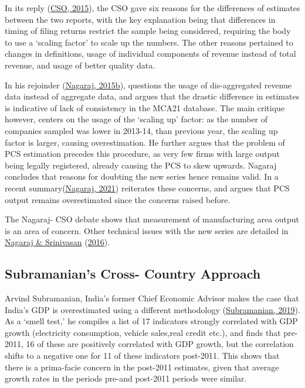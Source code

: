 \documentclass[12pt,nobind, a4paper]{reedthesis}
\begin{document}
 In its reply (\protect\hyperlink{ref-cso_no_2015}{CSO, 2015}), the CSO gave six reasons for the differences of estimates between the two reports, with the key explanation being that differences in timing of filing returns restrict the sample being considered, requiring the body to use a `scaling factor' to scale up the numbers. The other reasons pertained to changes in definitions, usage of individual components of revenue instead of total revenue, and usage of better quality data.
 \linebreak

 In his rejoinder (\protect\hyperlink{ref-nagaraj_seeds_2015}{Nagaraj, 2015b}), questions the usage of dis-aggregated revenue data instead of aggregate data, and argues that the drastic difference in estimates is indicative of lack of consistency in the MCA21 database. The main critique however, centers on the usage of the `scaling up' factor: as the number of companies sampled was lower in 2013-14, than previous year, the scaling up factor is larger, causing overestimation. He further argues that the problem of PCS estimation precedes this procedure, as very few firms with large output being legally registered, already causing the PCS to skew upwards. Nagaraj concludes that reasons for doubting the new series hence remains valid. In a recent summary(\protect\hyperlink{ref-nagaraj_revisiting_2021}{Nagaraj, 2021}) reiterates these concerns, and argues that PCS output remains overestimated since the concerns raised before.
 \linebreak

 The Nagaraj- CSO debate shows that measurement of manufacturing area output is an area of concern. Other technical issues with the new series are detailed in \protect\hyperlink{ref-nagaraj_measuring_2016}{Nagaraj \& Srinivasan} (\protect\hyperlink{ref-nagaraj_measuring_2016}{2016}).

 \hypertarget{subramanians-cross--country-approach}{%
 \subsection{Subramanian's Cross- Country Approach}\label{subramanians-cross--country-approach}}

 Arvind Subramanian, India's former Chief Economic Advisor makes the case that India's GDP is overestimated using a different methodology (\protect\hyperlink{ref-subramanian_indias_2019}{Subramanian, 2019}). As a `smell test,' he compiles a list of 17 indicators strongly correlated with GDP growth (electricity consumption, vehicle sales,real credit etc.), and finds that pre-2011, 16 of these are positively correlated with GDP growth, but the correlation shifts to a negative one for 11 of these indicators post-2011. This shows that there is a prima-facie concern in the post-2011 estimates, given that average growth rates in the periods pre-and post-2011 periods were similar.
 \linebreak
\end{document}
